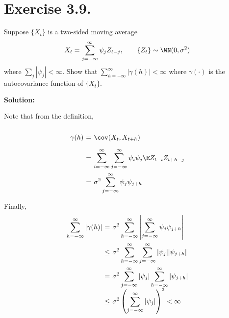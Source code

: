 \section*{Exercise 3.9.}

Suppose $\{X_t\}$ is a two-sided moving average
\[ X_t = \sum_{j = -\infty}^{\infty} \psi_j Z_{t-j},\hspace{2em} \{Z_t \} \sim \WN(0,\sigma^2) \]
where $\sum_j|\psi_j| < \infty$. Show that $\sum_{h = -\infty}^{\infty} |\gamma(h)| < \infty$ where $\gamma(\cdot)$ is the autocovariance function of $\{X_t\}$.

\textbf{Solution:}

Note that from the definition,
\[ \everymath{\displaystyle}
\arraycolsep=1.8pt\def\arraystretch{2.5}
\begin{array}{rcl}
    \gamma(h) & = & \cov(X_t, X_{t+h})\\
    & = & \sum_{i = -\infty}^{\infty} \sum_{j = -\infty}^{\infty} \psi_i \psi_j \E Z_{t-i}Z_{t+h-j}\\
    & = & \sigma^2 \sum_{j = -\infty}^{\infty} \psi_{j}\psi_{j+h}
\end{array} \]

Finally,
\[ \everymath{\displaystyle}
\arraycolsep=1.8pt\def\arraystretch{2.5}
\begin{array}{rcl}
    \sum_{h = -\infty}^{\infty} |\gamma(h)| & = & \sigma^2 \sum_{h = -\infty}^{\infty} \left| \sum_{j = -\infty}^{\infty} \psi_{j}\psi_{j+h} \right|\\
    & \leq & \sigma^2 \sum_{h = -\infty}^{\infty} \sum_{j = -\infty}^{\infty}|\psi_{j}||\psi_{j+h}|\\
    & = & \sigma^2 \sum_{j = -\infty}^{\infty} |\psi_{j}| \sum_{h = -\infty}^{\infty}|\psi_{j+h}|\\
    & \leq &  \sigma^2 \left( \sum_{j = -\infty}^{\infty} |\psi_{j}| \right)^2 < \infty
\end{array} \]